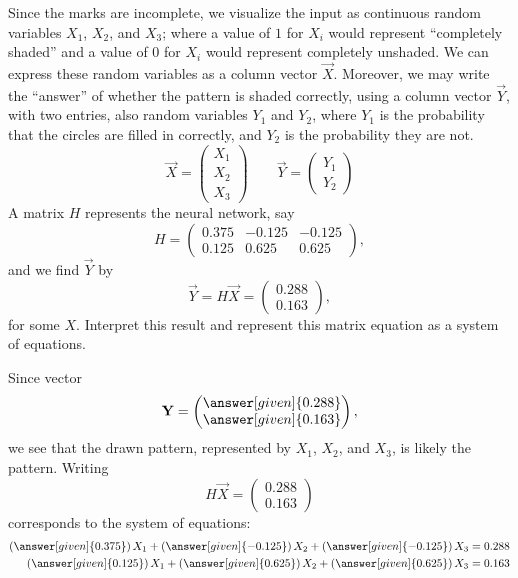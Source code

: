 \documentclass{ximera}
\begin{document}
\begin{example}
  Since the marks are incomplete, we visualize the input as continuous
  random variables $X_1$, $X_2$, and $X_3$; where a value of $1$ for
  $X_i$ would represent ``completely shaded'' and a value of $0$ for
  $X_i$ would represent completely unshaded. We can express these random
  variables as a column vector $\vec{X}$. Moreover, we may write the
  ``answer'' of whether the pattern is shaded correctly, using a column
  vector $\vec{Y}$, with two entries, also random variables $Y_1$ and
  $Y_2$, where $Y_1$ is the probability that the circles are filled in
  correctly, and $Y_2$ is the probability they are not.
  \[
    \vec{X} = \begin{pmatrix} X_1 \\ X_2 \\ X_3 \end{pmatrix} \qquad \vec{Y} = \begin{pmatrix} Y_1 \\ Y_2 \end{pmatrix}
  \]
  A matrix $H$ represents the neural network, say
  \[
    H = \begin{pmatrix}
      0.375 & -0.125 & -0.125 \\
      0.125 & 0.625 & 0.625
    \end{pmatrix},
  \]
  and we find $\vec{Y}$ by
  \[
    \vec{Y} =
    H\vec{X} =
    \begin{pmatrix}
      0.288 \\
      0.163
    \end{pmatrix},
  \]
  for some $X$. Interpret this result and represent this matrix
  equation as a system of equations.
  \begin{explanation}
    Since vector
    \[
      \vec{Y} =
      \begin{pmatrix}
        \answer[given]{0.288} \\
        \answer[given]{0.163}
      \end{pmatrix},
    \]
    we see that the drawn pattern, represented by $X_1$, $X_2$, and
    $X_3$, is likely the
     pattern.
    Writing
    \[
      H\vec{X} =
      \begin{pmatrix}
        0.288 \\
        0.163
      \end{pmatrix}
    \]
    corresponds to the system of equations:
    \begin{align*}
      \left(\answer[given]{0.375}\right)X_1 + \left(\answer[given]{-0.125}\right) X_2 + \left(\answer[given]{-0.125}\right) X_3 &= 0.288 \\
      \left(\answer[given]{0.125}\right)X_1 + \left(\answer[given]{0.625}\right) X_2 + \left(\answer[given]{0.625}\right)X_3 &= 0.163
    \end{align*}
  \end{explanation}
\end{example}
\end{document}
